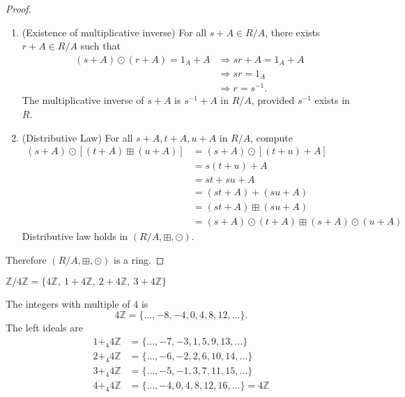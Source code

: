 \begin{proof}
\begin{enumerate}
    \item (Existence of multiplicative inverse) For all $s+A \in R/A$, there exists $r+A \in R/A$ such that 
    \begin{align*}
        (s + A) \odot (r+A) = 1_A + A &\Rightarrow sr+A = 1_A + A\\
        &\Rightarrow sr = 1_A\\
        &\Rightarrow r = s^{-1}.
    \end{align*}
    The multiplicative inverse of $s+A$ is $s^{-1} + A$ in $R/A$, provided $s^{-1}$ exists in $R$.

    \item (Distributive Law)  For all $s+A, t+A, u+A$ in $R/A$, compute 
    \begin{align*}
        (s+A) \odot [(t+A) \boxplus (u+A)] &= (s+A) \odot [(t+u) + A]\\
        &= s(t+u) + A\\
        &= st + su + A\\
        &= (st + A) + (su + A)\\
        &= (st+A) \boxplus (su+A)\\
        &= (s+A) \odot (t+A) \boxplus (s+A) \odot (u+A)
    \end{align*}
    Distributive law holds in $(R/A, \boxplus, \odot)$.
    \end{enumerate}

    Therefore $(R/A, \boxplus, \odot)$ is a ring.
\end{proof}

\begin{example}
    $\mathbb{Z}/4\mathbb{Z} = \{ 4\mathbb{Z},\>  1 + 4\mathbb{Z},\>  2+4\mathbb{Z},\> 3+4\mathbb{Z} \}$
\end{example}
\begin{solution}
    The integers with multiple of $4$ is 
    \[
        4\mathbb{Z} = \{\ldots, -8, -4, 0, 4, 8, 12, \ldots \}.
    \]
    The left ideals are 
    \begin{align*}
        1+_4 4\mathbb{Z} &= \{ \ldots, -7, -3, 1, 5, 9, 13, \ldots \}\\
        2+_4 4\mathbb{Z} &= \{ \ldots, -6, -2, 2, 6, 10, 14, \ldots \}\\
        3+_4 4\mathbb{Z} &= \{ \ldots, -5, -1, 3, 7, 11, 15, \ldots \}\\
        4+_4 4\mathbb{Z} &= \{ \ldots, -4, 0, 4, 8, 12, 16, \ldots \} = 4\mathbb{Z}
    \end{align*}
\end{solution}


